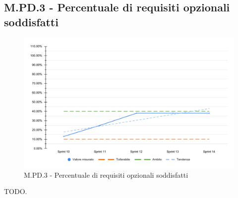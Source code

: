 \subsection{M.PD.3 - Percentuale di requisiti opzionali soddisfatti}

\begin{figure}[H]
    \centering
    \includegraphics[width=\textwidth]{assets/requisiti_opzionali_soddisfatti.pdf}
    \caption{M.PD.3 - Percentuale di requisiti opzionali soddisfatti}
\end{figure}

\par TODO.